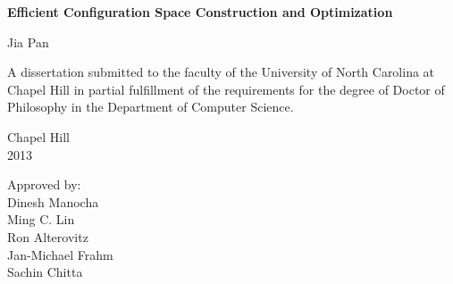 \begin{titlepage}
\begin{center}
\vspace{2in}
\begin{singlespace}
\Large \bf
Efficient Configuration Space Construction and Optimization
\end{singlespace}

\vspace{61pt} %
\large Jia Pan
\end{center}


\vspace{50pt}
\begin{singlespace}
\noindent \large
A dissertation submitted to the faculty of the University of North Carolina at Chapel Hill
in partial fulfillment of the requirements for the degree of Doctor of Philosophy in
the Department of Computer Science.
\end{singlespace}

\vspace{50pt}
\begin{center}
\begin{singlespace} \large
Chapel Hill\\
2013
\end{singlespace}
\end{center}


\vfill
\begin{flushright}
\begin{minipage}[t]{1.5in} \large
Approved by:\\
Dinesh Manocha \\
Ming C. Lin \\
Ron Alterovitz \\
Jan-Michael Frahm \\
Sachin Chitta
\end{minipage}
\end{flushright}
\end{titlepage}
